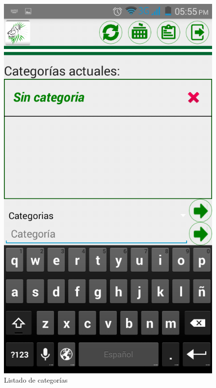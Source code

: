 \begin{figure}
\centering
\includegraphics[scale=0.5]{./android/imagenes/cat2.png}
\caption{Listado de categorías}
\label{cat2}
\end{figure}

